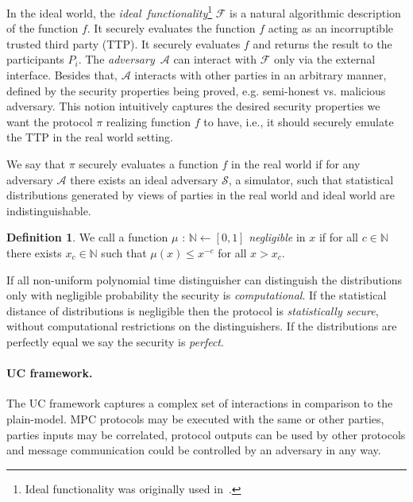 \documentclass[
  digital, %
  twoside, %
  table,   %
  lof,     %
  lot,     %
]{fithesis3}
\newcounter{ph4_show_guides}
\theoremstyle{definition}
\newtheorem{definition}{Definition}
\theoremstyle{remark}
\begin{document}
In the ideal world, the \emph{ideal~functionality}\footnote{Ideal functionality was originally used in~\cite{GMW87}.} $\mathcal{F}$ is a natural algorithmic description of the function $f$. It securely evaluates the function $f$ acting as an incorruptible trusted third party (TTP). It securely evaluates $f$ and returns the result to the participants $P_i$. The \emph{adversary}~$\mathcal{A}$ can interact with $\mathcal{F}$ only via the external interface. Besides that, $\mathcal{A}$ interacts with other parties in an arbitrary manner, defined by the security properties being proved, e.g. semi-honest vs. malicious adversary.
This notion intuitively captures the desired security properties we want the protocol $\pi$ realizing function $f$ to have, i.e., it should securely emulate the TTP in the real world setting.

We say that $\pi$ securely evaluates a function $f$ in the real world if for any adversary $\mathcal{A}$ there exists an ideal adversary $\mathcal{S}$, a simulator, such that statistical distributions generated by views of parties in the real world and ideal world are indistinguishable. 

\begin{definition}
	We call a function $\mu$ : $\mathbb{N} \leftarrow [0,1]$ \emph{negligible} in $x$ if for all $c \in \mathbb{N}$ there exists $x_c \in \mathbb{N}$ such that $\mu(x) \leq x^{-c}$ for all $x > x_c$.
\end{definition}

If all non-uniform polynomial time distinguisher can distinguish the distributions only with negligible probability the security is \emph{computational}. If the statistical distance of distributions is negligible then the protocol is \emph{statistically secure}, without computational restrictions on the distinguishers.
If the distributions are perfectly equal we say the security is \emph{perfect}. 


\paragraph{UC framework.}
The UC framework captures a complex set of interactions in comparison to the plain-model. MPC protocols may be executed with the same or other parties, parties inputs may be correlated, protocol outputs can be used by other protocols and message communication could be controlled by an adversary in any way. 
\end{document}

